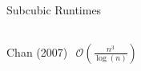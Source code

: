 \begin{frame}{Subcubic Runtimes}
\begin{columns}
\begin{column}{.25\linewidth}
            {
                \begin{alertblock}{Chan (2007)}
                    $\begin{aligned}
                        \mathcal{O}\left( \frac{n^3}{\log(n)} \right)
                    \end{aligned}$
                \end{alertblock}
            }
        \end{column}
    \end{columns}
\end{frame}
